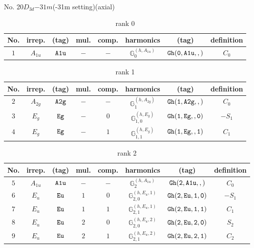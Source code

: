 \documentclass[fleqn,8pt]{jsarticle}
\begin{document}
\setcounter{MaxMatrixCols}{16}

\begin{center}
\LARGE
No. 20\quad$D_{3d}$\quad$-31m$\quad(-31m setting)\quad[ trigonal ] (axial)
\end{center}
\begin{table}[ht!]
\begin{center}
\caption{rank 0}
\renewcommand{\arraystretch}{1.3}
\begin{tabular}{cccccccc} \hline \hline
No. & irrep. & (tag) & mul. & comp. & harmonics & (tag) & definition \\ \hline
$ 1 $ & $ A_{1u} $ & $ {\tt A1u} $ & $ - $ & $ - $ & $ \mathbb{G}_{0}^{(h,A_{1u})} $ & $ {\tt Gh(0,A1u,,)} $ & $ C_{0} $ \\
 \hline \hline
\end{tabular}
\end{center}
\end{table}
\begin{table}[ht!]
\begin{center}
\caption{rank 1}
\renewcommand{\arraystretch}{1.3}
\begin{tabular}{cccccccc} \hline \hline
No. & irrep. & (tag) & mul. & comp. & harmonics & (tag) & definition \\ \hline
$ 2 $ & $ A_{2g} $ & $ {\tt A2g} $ & $ - $ & $ - $ & $ \mathbb{G}_{1}^{(h,A_{2g})} $ & $ {\tt Gh(1,A2g,,)} $ & $ C_{0} $ \\
$ 3 $ & $ E_{g} $ & $ {\tt Eg} $ & $ - $ & $ 0 $ & $ \mathbb{G}_{1,0}^{(h,E_{g})} $ & $ {\tt Gh(1,Eg,,0)} $ & $ - S_{1} $ \\
$ 4 $ & $ E_{g} $ & $ {\tt Eg} $ & $ - $ & $ 1 $ & $ \mathbb{G}_{1,1}^{(h,E_{g})} $ & $ {\tt Gh(1,Eg,,1)} $ & $ C_{1} $ \\
 \hline \hline
\end{tabular}
\end{center}
\end{table}
\begin{table}[ht!]
\begin{center}
\caption{rank 2}
\renewcommand{\arraystretch}{1.3}
\begin{tabular}{cccccccc} \hline \hline
No. & irrep. & (tag) & mul. & comp. & harmonics & (tag) & definition \\ \hline
$ 5 $ & $ A_{1u} $ & $ {\tt A1u} $ & $ - $ & $ - $ & $ \mathbb{G}_{2}^{(h,A_{1u})} $ & $ {\tt Gh(2,A1u,,)} $ & $ C_{0} $ \\
$ 6 $ & $ E_{u} $ & $ {\tt Eu} $ & $ 1 $ & $ 0 $ & $ \mathbb{G}_{2,0}^{(h,E_{u},1)} $ & $ {\tt Gh(2,Eu,1,0)} $ & $ - S_{1} $ \\
$ 7 $ & $ E_{u} $ & $ {\tt Eu} $ & $ 1 $ & $ 1 $ & $ \mathbb{G}_{2,1}^{(h,E_{u},1)} $ & $ {\tt Gh(2,Eu,1,1)} $ & $ C_{1} $ \\
$ 8 $ & $ E_{u} $ & $ {\tt Eu} $ & $ 2 $ & $ 0 $ & $ \mathbb{G}_{2,0}^{(h,E_{u},2)} $ & $ {\tt Gh(2,Eu,2,0)} $ & $ S_{2} $ \\
$ 9 $ & $ E_{u} $ & $ {\tt Eu} $ & $ 2 $ & $ 1 $ & $ \mathbb{G}_{2,1}^{(h,E_{u},2)} $ & $ {\tt Gh(2,Eu,2,1)} $ & $ C_{2} $ \\
 \hline \hline
\end{tabular}
\end{center}
\end{table}
\end{document}
